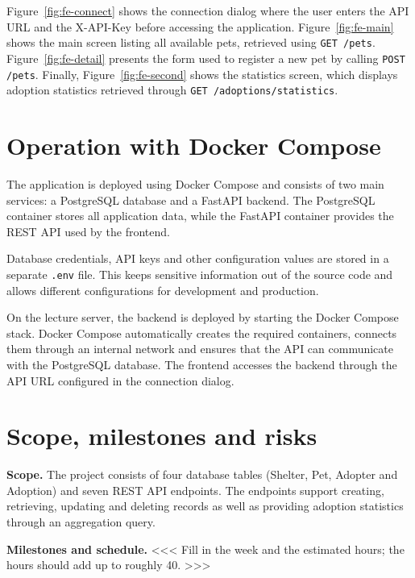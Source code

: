 \documentclass[11pt,a4paper]{article}
\begin{document}
Figure~\ref{fig:fe-connect} shows the connection dialog where the user enters
the API URL and the X-API-Key before accessing the application.
Figure~\ref{fig:fe-main} shows the main screen listing all available pets,
retrieved using \texttt{GET /pets}. Figure~\ref{fig:fe-detail} presents the form
used to register a new pet by calling \texttt{POST /pets}. Finally,
Figure~\ref{fig:fe-second} shows the statistics screen, which displays adoption
statistics retrieved through \texttt{GET /adoptions/statistics}.

\section{Operation with Docker Compose}

The application is deployed using Docker Compose and consists of two main
services: a PostgreSQL database and a FastAPI backend. The PostgreSQL container
stores all application data, while the FastAPI container provides the REST API
used by the frontend.

Database credentials, API keys and other configuration values are stored in a
separate \texttt{.env} file. This keeps sensitive information out of the source
code and allows different configurations for development and production.

On the lecture server, the backend is deployed by starting the Docker Compose
stack. Docker Compose automatically creates the required containers, connects
them through an internal network and ensures that the API can communicate with
the PostgreSQL database. The frontend accesses the backend through the API URL
configured in the connection dialog.

\section{Scope, milestones and risks}

\textbf{Scope.} The project consists of four database tables (Shelter, Pet, Adopter and
Adoption) and seven REST API endpoints. The endpoints support creating,
retrieving, updating and deleting records as well as providing adoption
statistics through an aggregation query.

\textbf{Milestones and schedule.} <<< Fill in the week and the estimated hours;
the hours should add up to roughly 40. >>>
\end{document}
